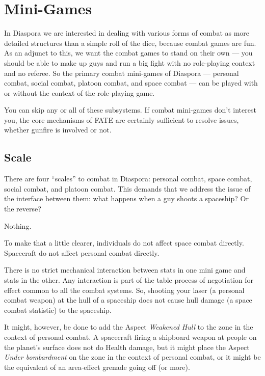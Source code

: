 \section{Mini-Games}
\label{sec:mini-games}

In Diaspora we are interested in dealing with various forms of combat as more detailed structures than a simple roll of the dice, because combat games are fun. As an adjunct to this, we want the combat games to stand on their own --- you should be able to make up guys and run a big fight with no role-playing context and no referee.  So the primary combat mini-games of Diaspora --- personal combat, social combat, platoon combat, and space combat --- can be played with or without the context of the role-playing game.

You can skip any or all of these subsystems. If combat mini-games don't interest you, the core mechanisms of FATE are certainly sufficient to resolve issues, whether gunfire is involved or not.

\iflandscape{}{\vfil}
\subsection{Scale}
\label{sec:scale}

There are four ``scales'' to combat in Diaspora: personal combat, space combat, social combat, and platoon combat. This demands that we address the issue of the interface between them: what happens when a guy shoots a spaceship? Or the reverse?

Nothing.

To make that a little clearer, individuals do not affect space combat directly. Spacecraft do not affect personal combat directly.

There is no strict mechanical interaction between stats in one mini game and stats in the other. Any interaction is part of the table process of negotiation for effect common to all the combat systems. So, shooting your laser (a personal combat weapon) at the hull of a spaceship does not cause hull damage (a space combat statistic) to the spaceship.

It might, however, be done to add the Aspect \emph{Weakened Hull} to the zone in the context of personal combat. A spacecraft firing a shipboard weapon at people on the planet's surface does not do Health damage, but it might place the Aspect \emph{Under bombardment} on the zone in the context of personal combat, or it might be the equivalent of an area-effect grenade going off (or more).

